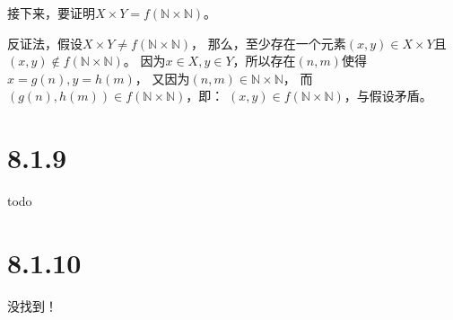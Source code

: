 \documentclass{article}
\theoremstyle{mystyle}
\begin{document}
接下来，要证明$X \times Y = f(\mathbb{N} \times \mathbb{N})$。

反证法，假设$X \times Y \neq f(\mathbb{N} \times \mathbb{N})$，
那么，至少存在一个元素$(x,y) \in X \times Y$且$(x,y) \not \in f(\mathbb{N} \times \mathbb{N})$。
因为$x \in X, y\in Y$，所以存在$(n,m)$使得$x = g(n), y=h(m)$，
又因为$(n,m) \in \mathbb{N} \times \mathbb{N}$，
而$(g(n),h(m)) \in f(\mathbb{N} \times \mathbb{N})$，即：
$(x,y) \in f(\mathbb{N} \times \mathbb{N})$，与假设矛盾。


\section*{8.1.9}

todo 


\section*{8.1.10}
没找到！
\end{document}
